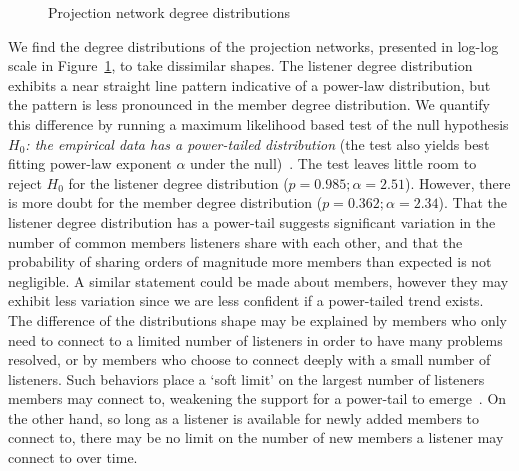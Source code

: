 \begin{figure}[t]
	\hfill
	\caption{Projection network degree distributions}
	\label{fig:dd}
\end{figure}

We find the degree distributions of the projection networks, presented in log-log
scale in Figure~\ref{fig:dd}, to take dissimilar shapes. The listener degree
distribution exhibits a near straight line pattern
indicative of a power-law distribution, but the  pattern is less pronounced 
in the member degree distribution. 
We quantify this difference by running a maximum likelihood based test of the null hypothesis 
{\em $H_0$: the empirical data has a power-tailed distribution} (the test also yields
best fitting power-law exponent $\alpha$ under the null)~\cite{clauset2009power}.
The test leaves little room to reject $H_0$ for the listener degree distribution 
($p = 0.985; \alpha = 2.51$). However, there is more doubt for
the member degree distribution ($p = 0.362; \alpha = 2.34$). 
That the listener degree distribution has a
power-tail suggests significant variation in the number of common members listeners share
with each other, and that the probability of sharing orders of magnitude more members than
expected is not negligible. A similar statement could be made about members, however 
they may exhibit less variation since we are less confident if a power-tailed trend exists. 
The difference of the distributions shape may be explained by members who only need to connect to a limited
number of listeners in order to have many problems resolved, or by members who choose to 
connect deeply with a small number of listeners. Such behaviors place
a `soft limit' on the largest number of listeners members may connect to, weakening the support for a 
power-tail to emerge~\cite{lipsky2008queueing}.  On the other hand, so long as a listener is available for 
newly added members to connect to, there may be no limit on the number of 
new members a listener may connect to over time.

